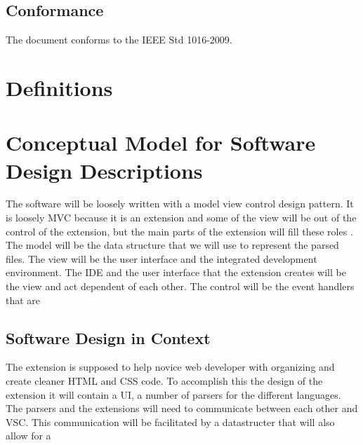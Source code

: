 \documentclass[letterpaper,10pt,titlepage,draftclsnofoot,onecolumn,onesided] {IEEEtran}
\begin{document}
\subsection{Conformance}
The document conforms to the IEEE Std 1016-2009.

\section{Definitions}
\newtheorem{VSC}{An acronym of Visual Studio Code. Visaul Studio Code is the IDE for which the postal extension is being built.}
\newtheorem{IDE}{An acronym of Integrated Development Environment.}
\newtheorem{UI}{An acronym of User Interface}
\newtheorem{MVC}{Model-View-Controller (MVC) design pattern assigns objects in an application one of three roles: model, view, or controller. The pattern defines not only the roles objects play in the application, it defines the way objects communicate with each other. Each of the three types of objects is separated from the others by abstract boundaries and communicates with objects of the other types across those boundaries. The collection of objects of a certain MVC type in an application is sometimes referred to as a layer—for example, model layer.\cite{appleMVC}}

\section{Conceptual Model for Software Design Descriptions}
The software will be loosely written with a model view control design pattern.
It is loosely MVC because it is an extension and some of the view will be out of the control of the extension, but the main parts of the extension will fill these roles .
The model will be the data structure that we will use to represent the parsed files. 
The view will be the user interface and the integrated development environment.
The IDE and the user interface that the extension creates will be the view and act dependent of each other.
The control will be the event handlers that are 

\subsection{Software Design in Context}
The extension is supposed to help novice web developer with organizing and create cleaner HTML and CSS code. 
To accomplish this the design of the extension it will contain a UI, a number of parsers for the different languages.
The parsers and the extensions will need to communicate between each other and VSC.
This communication will be facilitated by a datastructer that will also allow for a 
\end{document}
